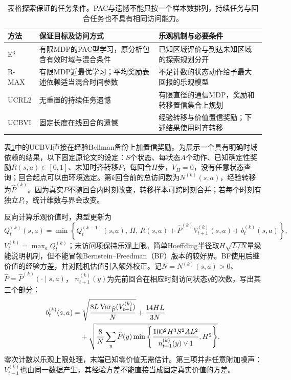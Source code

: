 \begin{table}[t]
  \centering
  \small
  \begin{tabularx}{\linewidth}{>{\raggedright\arraybackslash}p{20mm} >{\raggedright\arraybackslash}X >{\raggedright\arraybackslash}X}
    \toprule
    方法 & 保证目标及访问方式 & 乐观机制与必要条件 \\
    \midrule
    E$^3$ & 有限MDP的PAC型学习，原分析包含有效时域与混合条件 & 已知区域评价与到达未知区域的探索规划分开 \\
    R-MAX & 有限MDP近最优学习；平均奖励表述依赖适当混合时间参数 & 不足计数的状态动作给予最大回报的乐观模型 \\
    UCRL2 & 无重置的持续任务遗憾 & 有限直径的通信MDP，奖励和转移置信集合上规划 \\
    UCBVI & 固定长度在线回合的遗憾 & 经验转移与价值置信奖励；下述结果使用时齐转移 \\
    \bottomrule
  \end{tabularx}
  \caption{表格探索保证的任务条件。PAC与遗憾不能只按一个样本数排列，持续任务与回合任务也不具有相同访问能力。}
  \label{tab:rl-learning-tabular-methods}
\end{table}

表\ref{tab:rl-learning-tabular-methods}中的UCBVI直接在经验Bellman备份上加置信奖励。为展示一个具有明确时域依赖的结果，以下固定原论文的设定：$S$个状态、每状态$A$个动作、已知确定性奖励$R(s,a)\in[0,1]$、未知时齐转移$P$，每回合$H$步，$V_H=0$，没有任意状态查询；回合起点可以由环境选定。第$k$回合前的总访问数为$N^{(k)}(s,a)$，经验转移为$\widehat P^{(k)}$。因为真实$P$不随回合内时刻改变，转移样本可跨时刻合并；若每个时刻有独立$P_t$，统计维数与界会改变。

反向计算乐观价值时，典型更新为
\[
 Q_t^{(k)}(s,a)
   =\min\left\{Q_t^{(k-1)}(s,a),\,H,\,
       R(s,a)+\widehat P^{(k)}V_{t+1}^{(k)}(s,a)
                         +b_t^{(k)}(s,a)\right\},
\]
$V_t^{(k)}=\max_aQ_t^{(k)}$；未访问项保持乐观上限。简单Hoeffding半径取$H\sqrt{L/N}$量级能说明机制，但不能冒领Bernstein--Freedman（BF）版本的较好界。BF使用后继价值的经验方差，并对随机估值引入额外校正。记$N=N^{(k)}(s,a)>0$、$\widehat P=\widehat P^{(k)}(\cdot\mid s,a)$，
$n_{t+1}^{(k)}(y)$为先前回合在相应时刻访问状态$y$的次数，写出其三个部分：
\begin{align}
 b_t^{(k)}(s,a)
  &=\sqrt{\frac{8L\operatorname{Var}_{\widehat P}
                                  (V_{t+1}^{(k)})}{N}}
       +\frac{14HL}{3N}\notag\\
  &\quad+\sqrt{\frac{8}{N}\sum_y\widehat P(y)
         \min\left\{
           \frac{100^2H^3S^2AL^2}{n_{t+1}^{(k)}(y)\vee1},H^2
                  \right\}} .
 \label{eq:rl-learning-ucbvi-bonus}
\end{align}
零次计数以乐观上限处理，末端已知零价值无需估计。第三项并非任意附加噪声：$V_{t+1}^{(k)}$也由同一数据产生，其经验方差不能直接当成固定真实价值的方差。

